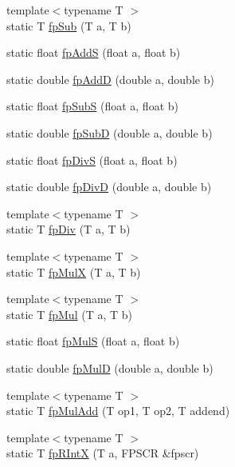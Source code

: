 \begin{DoxyCompactItemize}
\item 
{\footnotesize template$<$typename T $>$ }\\static T \hyperlink{namespaceArmISA_a2ba43e7b3d2d0c18c02228809d56eef4}{fpSub} (T a, T b)
\item 
static float \hyperlink{namespaceArmISA_a30d928e550eec7b1e060695cd23cc775}{fpAddS} (float a, float b)
\item 
static double \hyperlink{namespaceArmISA_a7555a577746b606b35fe2aecd1030008}{fpAddD} (double a, double b)
\item 
static float \hyperlink{namespaceArmISA_a8d714d2cfd87ec8cd08863e48dbed215}{fpSubS} (float a, float b)
\item 
static double \hyperlink{namespaceArmISA_a146bef01a3d1b1d6099b506a969ca740}{fpSubD} (double a, double b)
\item 
static float \hyperlink{namespaceArmISA_a9ce23f6d7f92886b3f294ce377a9689b}{fpDivS} (float a, float b)
\item 
static double \hyperlink{namespaceArmISA_ac1f5d84bf5f7004c05f07dc492cf6733}{fpDivD} (double a, double b)
\item 
{\footnotesize template$<$typename T $>$ }\\static T \hyperlink{namespaceArmISA_a941c796adcf6bf2bdf58c1e15f986e50}{fpDiv} (T a, T b)
\item 
{\footnotesize template$<$typename T $>$ }\\static T \hyperlink{namespaceArmISA_a81ca9d9e862be25da649b1fd6fa3c271}{fpMulX} (T a, T b)
\item 
{\footnotesize template$<$typename T $>$ }\\static T \hyperlink{namespaceArmISA_a5569d803a7d16590d6b80fcd795bfa5f}{fpMul} (T a, T b)
\item 
static float \hyperlink{namespaceArmISA_ab42c2c2188079a87ea44af3e76a32f7a}{fpMulS} (float a, float b)
\item 
static double \hyperlink{namespaceArmISA_a31f18bd00d9f444faade55185aa3f281}{fpMulD} (double a, double b)
\item 
{\footnotesize template$<$typename T $>$ }\\static T \hyperlink{namespaceArmISA_a50b8f77c6301d581ec423d7401c10716}{fpMulAdd} (T op1, T op2, T addend)
\item 
{\footnotesize template$<$typename T $>$ }\\static T \hyperlink{namespaceArmISA_a8654f55b0af7a967f62c30c2eaade245}{fpRIntX} (T a, FPSCR \&fpscr)
\item 

\end{DoxyCompactItemize}
